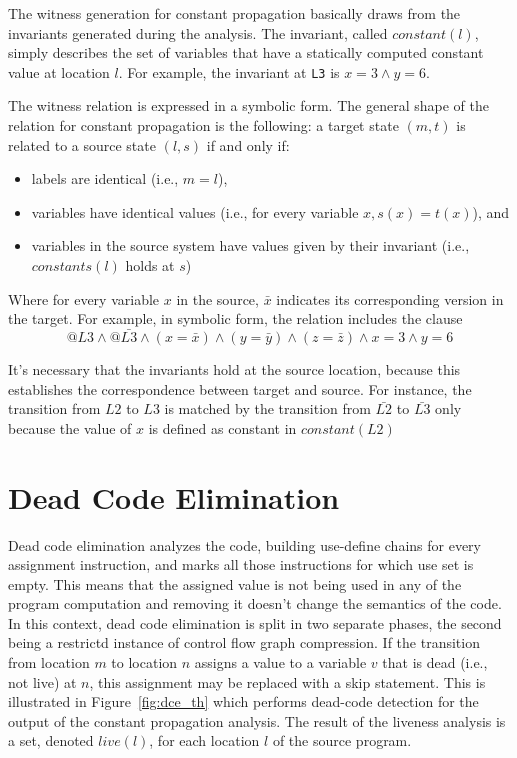 The witness generation for constant propagation basically draws from the invariants generated during the analysis. The invariant, called $constant(l)$, simply describes the set of variables that have a statically computed constant value at location $l$. For example, the invariant at \texttt{L3} is $x =3 \land y = 6$.

The witness relation is expressed in a symbolic form. The general shape of the relation for constant propagation is the following: a target state $(m, t)$ is related to a source state $(l, s)$ if and only if:
\begin{itemize}
  \item labels are identical (i.e., $m = l$),
  \item variables have identical values (i.e., for every variable $x, s(x) = t(x)$), and
  \item variables in the source system have values given by their invariant (i.e., $constants(l)$ holds at $s$)
\end{itemize}
Where for every variable $x$ in the source, $\bar{x}$ indicates its corresponding version in the target. For example, in symbolic form, the relation includes the clause
\[
  @L3 \land @\bar{L3} \land (x = \bar{x}) \land (y = \bar{y}) \land (z = \bar{z}) \land x = 3 \land y = 6
\]

It's necessary that the invariants hold at the source location, because this establishes the correspondence between target and source. For instance, the transition from $L2$ to $L3$ is matched by the transition from $\bar{L2}$ to $\bar{L3}$ only because the value of $x$ is defined as constant in $constant(L2)$

\section{Dead Code Elimination}
\label{sec:dce_and_cfgc_th}

Dead code elimination analyzes the code, building use-define chains for every assignment instruction, and marks all those instructions for which use set is empty. This means that the assigned value is not being used in any of the program computation and removing it doesn't change the semantics of the code. In this context, dead code elimination is split in two separate phases, the second being a restrictd instance of control flow graph compression. If the transition from location $m$ to location $n$ assigns a value to a variable $v$ that is dead (i.e., not live) at $n$, this assignment may be replaced with a skip statement. This is illustrated in Figure~\ref{fig:dce_th} which performs dead-code detection for the output of the constant propagation analysis. The result of the liveness analysis is a set, denoted $live(l)$, for each location $l$ of the source program.


